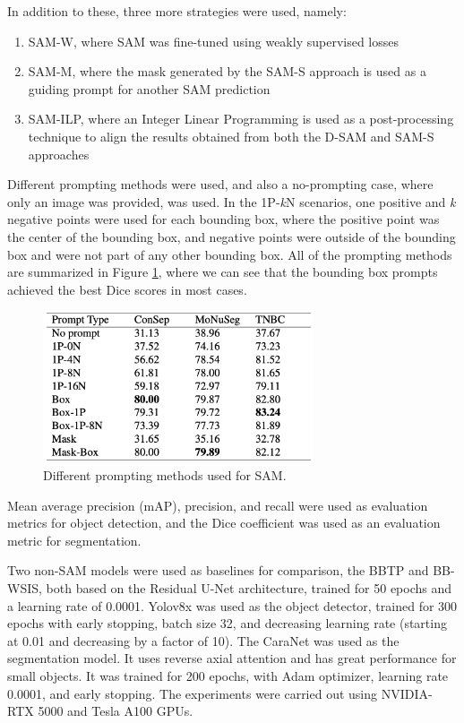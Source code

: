 In addition to these, three more strategies were used, namely:

\begin{enumerate}
    \item SAM-W, where SAM was fine-tuned using weakly supervised losses
    \item SAM-M, where the mask generated by the SAM-S approach is used as a guiding prompt for another SAM prediction
    \item SAM-ILP, where an Integer Linear Programming is used as a post-processing technique to align the results obtained from both the D-SAM and SAM-S approaches
\end{enumerate}

Different prompting methods were used, and also a no-prompting case, where only an image was provided, was used. In the 1P-\textit{k}N scenarios, one positive and \textit{k} negative points were used for each bounding box, where the positive point was the center of the bounding box, and negative points were outside of the bounding box and were not part of any other bounding box. All of the prompting methods are summarized in Figure \ref{fig:rw-sam-prompting}, where we can see that the bounding box prompts achieved the best Dice scores in most cases.

\begin{figure}[H]
    \begin{centering}
    \includegraphics[width=8cm]{assets/images/rw-table-prompting.png}
    \par\end{centering}
    \caption{Different prompting methods used for SAM.}
    \label{fig:rw-sam-prompting}
\end{figure}

Mean average precision (mAP), precision, and recall were used as evaluation metrics for object detection, and the Dice coefficient was used as an evaluation metric for segmentation.

Two non-SAM models were used as baselines for comparison, the BBTP and BB-WSIS, both based on the Residual U-Net architecture, trained for 50 epochs and a learning rate of 0.0001. Yolov8x was used as the object detector, trained for 300 epochs with early stopping, batch size 32, and decreasing learning rate (starting at 0.01 and decreasing by a factor of 10). The CaraNet was used as the segmentation model. It uses reverse axial attention and has great performance for small objects. It was trained for 200 epochs, with Adam optimizer, learning rate 0.0001, and early stopping. The experiments were carried out using NVIDIA-RTX 5000 and Tesla A100 GPUs.

